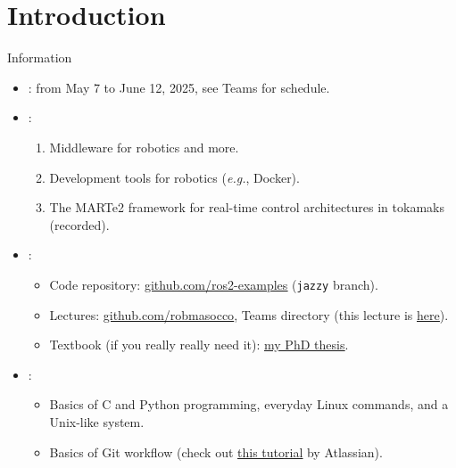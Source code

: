 
\section{Introduction}
\graphicspath{{figs/section1/}}

\begin{frame}{Information}
  \begin{itemize}
    \item {}: from May 7 to June 12, 2025, see Teams for schedule.
    \item {}:
          \begin{enumerate}
            \item Middleware for robotics and more.
            \item Development tools for robotics (\emph{e.g.}, Docker).
            \item The MARTe2 framework for real-time control architectures in tokamaks (recorded).
          \end{enumerate}
    \item {}:
          \begin{itemize}
            \item Code repository: \href{https://github.com/IntelligentSystemsLabUTV/ros2-examples}{\color{blue}\underline{github.com/ros2-examples}} (\texttt{jazzy} branch).
            \item Lectures: \href{https://github.com/stars/robmasocco/lists/dafn25}{\color{blue}\underline{github.com/robmasocco}}, Teams directory (this lecture is \href{https://github.com/robmasocco/DAFN25_Robotics_1}{\color{blue}\underline{here}}).
            \item Textbook (if you really really need it): \href{http://dx.doi.org/10.13140/RG.2.2.30948.90247}{\color{blue}\underline{my PhD thesis}}.
          \end{itemize}
    \item {}:
          \begin{itemize}
            \item Basics of C and Python programming, everyday Linux commands, and a Unix-like system.
            \item Basics of Git workflow (check out \href{https://www.atlassian.com/git/tutorials/what-is-git}{\color{blue}\underline{this tutorial}} by Atlassian).
          \end{itemize}
  \end{itemize}
\end{frame}


